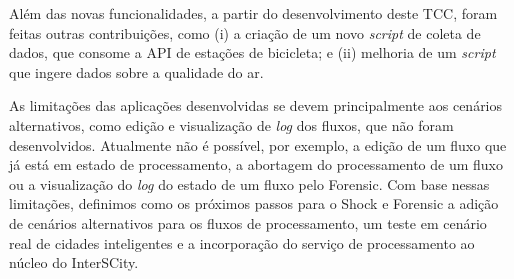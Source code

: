 Além das novas funcionalidades, a partir do desenvolvimento deste TCC, foram
feitas outras contribuições, como (i) a criação de um novo \textit{script} de
coleta de dados, que consome a API de estações de bicicleta; e (ii) melhoria 
de um \textit{script} que ingere dados sobre a qualidade do ar.

As limitações das aplicações desenvolvidas se devem principalmente aos cenários
alternativos, como edição e visualização de \textit{log} dos fluxos,
que não foram desenvolvidos. Atualmente não é possível, por exemplo, a edição de
um fluxo que já está em estado de processamento, a abortagem do
processamento de um fluxo ou a visualização do \textit{log} do
estado de um fluxo pelo Forensic. Com base nessas limitações,
definimos como os próximos passos para o Shock e Forensic a adição de cenários
alternativos para os fluxos de processamento, um teste em cenário real de cidades
inteligentes e a incorporação do serviço de processamento ao núcleo do
InterSCity.
